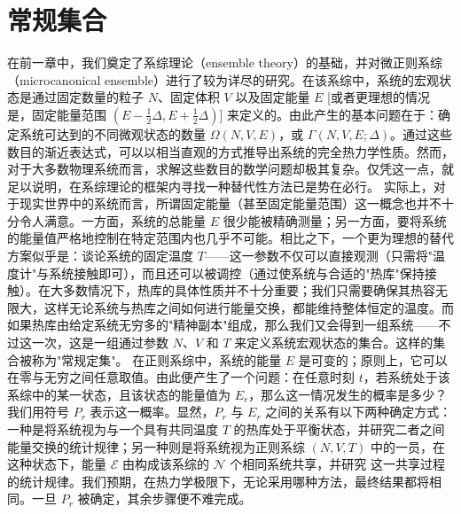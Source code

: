 ﻿\chapter{常规集合}\label{ux5e38ux89c4ux96c6ux5408}
在前一章中，我们奠定了系综理论（ensemble theory）的基础，并对微正则系综（microcanonical ensemble）进行了较为详尽的研究。在该系综中，系统的宏观状态是通过固定数量的粒子 \(N\)、固定体积 \(V\) 以及固定能量 \(E\) {[}或者更理想的情况是，固定能量范围 \((E-\frac{1}{2}\Delta, E+\frac{1}{2}\Delta)\){]} 来定义的。由此产生的基本问题在于：确定系统可达到的不同微观状态的数量 \(\Omega(N,V,E)\)，或 \(\Gamma(N,V,E;\Delta)\)。通过这些数目的渐近表达式，可以以相当直观的方式推导出系统的完全热力学性质。然而，对于大多数物理系统而言，求解这些数目的数学问题却极其复杂。仅凭这一点，就足以说明，在系综理论的框架内寻找一种替代性方法已是势在必行。
实际上，对于现实世界中的系统而言，所谓固定能量（甚至固定能量范围）这一概念也并不十分令人满意。一方面，系统的总能量 \(E\) 很少能被精确测量；另一方面，要将系统的能量值严格地控制在特定范围内也几乎不可能。相比之下，一个更为理想的替代方案似乎是：谈论系统的固定温度 \(T\)——这一参数不仅可以直接观测（只需将"温度计"与系统接触即可），而且还可以被调控（通过使系统与合适的"热库"保持接触）。在大多数情况下，热库的具体性质并不十分重要；我们只需要确保其热容无限大，这样无论系统与热库之间如何进行能量交换，都能维持整体恒定的温度。而如果热库由给定系统无穷多的"精神副本"组成，那么我们又会得到一组系统——不过这一次，这是一组通过参数 \(N\)、\(V\) 和 \(T\) 来定义系统宏观状态的集合。这样的集合被称为"常规定集"。
在正则系综中，系统的能量 \(E\) 是可变的；原则上，它可以在零与无穷之间任意取值。由此便产生了一个问题：在任意时刻 \(t\)，若系统处于该系综中的某一状态，且该状态的能量值为 \(E_r\)，那么这一情况发生的概率是多少？我们用符号 \(P_r\) 表示这一概率。显然，\(P_r\) 与 \(E_r\) 之间的关系有以下两种确定方式：一种是将系统视为与一个具有共同温度 \(T\) 的热库处于平衡状态，并研究二者之间能量交换的统计规律；另一种则是将系统视为正则系综 \((N, V, T)\) 中的一员，在这种状态下，能量 \(\mathcal{E}\) 由构成该系综的 \(\mathcal{N}\) 个相同系统共享，并研究
这一共享过程的统计规律。我们预期，在热力学极限下，无论采用哪种方法，最终结果都将相同。一旦 \(P_{r}\) 被确定，其余步骤便不难完成。
